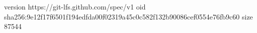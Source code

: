 version https://git-lfs.github.com/spec/v1
oid sha256:9e12f17f6501f194edfda00f02319a45c0c582f132b90086cef0554e76fb9c60
size 87544
